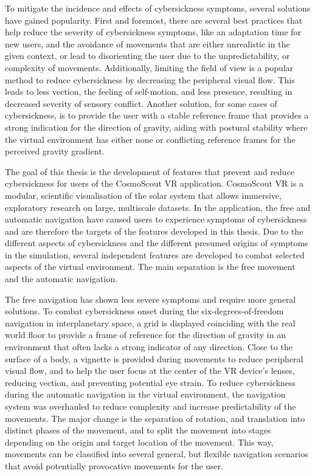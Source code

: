 To mitigate the incidence and effects of cybersickness symptoms, several solutions have gained popularity.
First and foremost, there are several best practices that help reduce the severity of cybersickness symptoms, like an
adaptation time for new users, and the avoidance of movements that are either unrealistic in the given context, or
lead to disorienting the user due to the unpredictability, or complexity of movements.
Additionally, limiting the field of view is a popular method to reduce cybersickness by decreasing the peripheral
visual flow.
This leads to less vection, the feeling of self-motion, and less presence, resulting in decreased severity of sensory
conflict.
Another solution, for some cases of cybersickness, is to provide the user with a stable reference frame that provides a
strong indication for the direction of gravity, aiding with postural stability where the virtual environment has
either none or conflicting reference frames for the perceived gravity gradient.

The goal of this thesis is the development of features that prevent and reduce cybersickness for users of the
CosmoScout VR application.
CosmoScout VR is a modular, scientific visualisation of the solar system that allows immersive, exploratory research
on large, multiscale datasets.
In the application, the free and automatic navigation have caused users to experience symptoms of cybersickness and
are therefore the targets of the features developed in this thesis.
Due to the different aspects of cybersickness and the different presumed origins of symptoms in the simulation,
several independent features are developed to combat selected aspects of the virtual environment.
The main separation is the free movement and the automatic navigation.

The free navigation has shown less severe symptoms and require more general solutions.
To combat cybersickness onset during the six-degrees-of-freedom navigation in interplanetary space, a grid is
displayed coinciding with the real world floor to provide a frame of reference for the direction of gravity in an
environment that often lacks a strong indicator of any direction.
Close to the surface of a body, a vignette is provided during movements to reduce peripheral visual flow, and to help
the user focus at the center of the VR device's lenses, reducing vection, and preventing potential eye strain.
To reduce cybersickness during the automatic navigation in the virtual environment, the navigation system was
overhauled to reduce complexity and increase predictability of the movements.
The major change is the separation of rotation, and translation into distinct phases of the movement, and to split the
movement into stages depending on the origin and target location of the movement.
This way, movements can be classified into several general, but flexible navigation scenarios that avoid potentially
provocative movements for the user.

